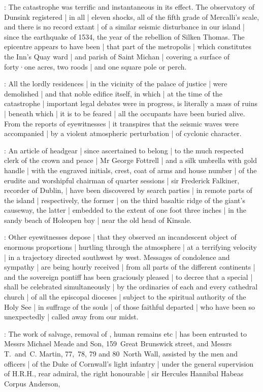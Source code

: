 :
The catastrophe was terrific and instantaneous in its effect.
The observatory of Dunsink registered |
in all |
eleven shocks,
all of the fifth grade of Mercalli's scale,
and there is no record extant |
of a similar seismic disturbance in our island |
since the earthquake of 1534,
the year of the rebellion of Silken Thomas.
The epicentre appears to have been |
that part of the metropolis |
which constitutes the Inn's Quay ward |
and parish of Saint Michan |
covering a surface of forty·one acres,
two roods |
and one square pole or perch.

:
All the lordly residences |
in the vicinity of the palace of justice |
were demolished |
and that noble edifice itself,
in which |
at the time of the catastrophe |
important legal debates were in progress,
is literally a mass of ruins |
beneath which |
it is to be feared |
all the occupants have been buried alive.
From the reports of eyewitnesses |
it transpires that the seismic waves were accompanied
 |
by a violent atmospheric perturbation |
of cyclonic character.

:
An article of headgear |
since ascertained to belong |
to the much respected clerk of the crown and peace |
Mr George Fottrell |
and a silk umbrella with gold handle |
with the engraved initials,
crest,
coat of arms
and house number |
of the erudite and worshipful chairman of quarter sessions |
sir Frederick Falkiner,
recorder of Dublin, |
have been discovered by search parties |
in remote parts of the island |
respectively,
the former |
on the third basaltic ridge of the giant's causeway,
the latter |
embedded to the extent of one foot three inches |
in the sandy beach of Holeopen bay |
near the old head of Kinsale.

:
Other eyewitnesses depose |
that they observed an incandescent object of enormous proportions
 |
hurtling through the atmosphere |
at a terrifying velocity |
in a trajectory directed southwest by west.
Messages of condolence and sympathy |
are being hourly received |
from all parts of the different continents |
and the sovereign pontiff has been graciously pleased |
to decree that a special  |
shall be celebrated simultaneously |
by the ordinaries of each and every cathedral church |
of all the episcopal dioceses |
subject to the spiritual authority of the Holy See |
in suffrage of the souls |
of those faithful departed |
who have been so unexpectedly |
called away from our midst.

:
The work of salvage,
removal of ,
human remains etc |
has been entrusted to Messrs Michael Meade and Son,
159~Great Brunswick street,
and Messrs T.~and~C. Martin,
77,~78, 79 and 80~North Wall,
assisted by the men and officers |
of the Duke of Cornwall's light infantry |
under the general supervision of H.R.H.,
rear admiral,
the right honourable |
sir Hercules Hannibal Habeas Corpus Anderson,

